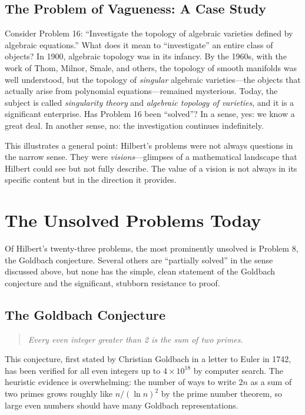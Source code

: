 \subsection{The Problem of Vagueness: A Case Study}

Consider Problem 16: ``Investigate the topology of algebraic varieties defined by algebraic equations.'' What does it mean to ``investigate'' an entire class of objects? In 1900, algebraic topology was in its infancy. By the 1960s, with the work of Thom, Milnor, Smale, and others, the topology of smooth manifolds was well understood, but the topology of \emph{singular} algebraic varieties---the objects that actually arise from polynomial equations---remained mysterious. Today, the subject is called \emph{singularity theory} and \emph{algebraic topology of varieties}, and it is a significant enterprise. Has Problem 16 been ``solved''? In a sense, yes: we know a great deal. In another sense, no: the investigation continues indefinitely.

This illustrates a general point: Hilbert's problems were not always questions in the narrow sense. They were \emph{visions}---glimpses of a mathematical landscape that Hilbert could see but not fully describe. The value of a vision is not always in its specific content but in the direction it provides.

\section{The Unsolved Problems Today}

Of Hilbert's twenty-three problems, the most prominently unsolved is Problem 8, the Goldbach conjecture. Several others are ``partially solved'' in the sense discussed above, but none has the simple, clean statement of the Goldbach conjecture and the significant, stubborn resistance to proof.

\subsection{The Goldbach Conjecture}

\begin{quote}
\textit{Every even integer greater than 2 is the sum of two primes.}
\end{quote}

This conjecture, first stated by Christian Goldbach in a letter to Euler in 1742, has been verified for all even integers up to $4 \times 10^{18}$ by computer search. The heuristic evidence is overwhelming: the number of ways to write $2n$ as a sum of two primes grows roughly like $n / (\ln n)^2$ by the prime number theorem, so large even numbers should have many Goldbach representations.

